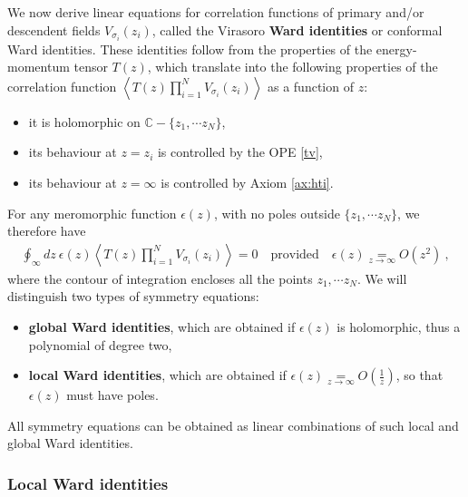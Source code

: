 \documentclass[12pt, a4paper, notitlepage, twoside]{report}
\numberwithin{equation}{section}
\theoremstyle{break}
\begin{document}
We now derive linear equations for correlation functions of primary and/or descendent fields $V_{\sigma_i}(z_i)$, called the Virasoro \textbf{\boldmath Ward identities} or conformal Ward identities.
These identities follow from the properties of the energy-momentum tensor $T(z)$, which translate into the following properties of the correlation function $\left\langle T(z)\prod_{i=1}^N V_{\sigma_i}(z_i) \right\rangle$ as a function of $z$:
\begin{itemize}
 \item it is holomorphic on ${\mathbb{C}}-\{z_1,\cdots z_N\}$,
\item its behaviour at $z=z_i$ is controlled by the OPE \eqref{tv},
\item its behaviour at $z=\infty$ is controlled by Axiom \ref{ax:hti}.
\end{itemize}
For any meromorphic function $\epsilon(z)$, with no poles outside $\{z_1,\cdots z_N\}$, we therefore have
\begin{align}
 \oint_\infty dz\ \epsilon(z) \left\langle T(z)\prod_{i=1}^N V_{\sigma_i}(z_i) \right\rangle = 0 \quad \text{provided} \quad \epsilon(z)\underset{z\to\infty}{=} O(z^2)\ ,
\label{oiz}
\end{align}
where the contour of integration encloses all the points $z_1,\cdots z_N$.
We will distinguish two types of symmetry equations:
\begin{itemize}
 \item \textbf{\boldmath global Ward identities}, which are obtained if $\epsilon(z)$ is holomorphic, thus a polynomial of degree two, 
\item \textbf{\boldmath local Ward identities}, which are obtained if $\epsilon(z) \underset{z\to\infty}{=} O(\frac{1}{z})$, so that $\epsilon(z)$ must have poles.
\end{itemize}
All symmetry equations can be obtained as linear combinations of such local and global Ward identities.

\subsubsection{Local Ward identities}
\end{document}
